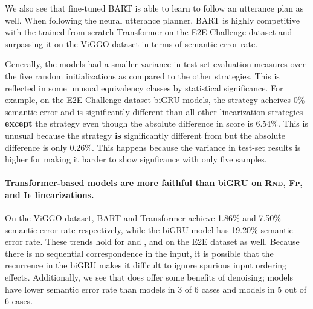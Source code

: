 We also see that fine-tuned BART is able to learn to follow an utterance plan
as well. When following the neural utterance planner,
BART is highly competitive with the trained from scratch Transformer
on the E2E Challenge dataset and surpassing it on the ViGGO dataset in terms of semantic error rate.


%




    Generally, the  models had a smaller variance in test-set
evaluation measures over the five random initializations as compared to the
other strategies. This is reflected in some unusual equivalency classes
by statistical significance. For example, on the E2E Challenge dataset biGRU models,
the  strategy acheives 0\% semantic error and is significantly
different than all other linearization strategies \textbf{except} 
the  strategy even though the absolute difference in score is 
6.54\%. This is unusual because the  strategy \textbf{is} 
significantly different from  but the absolute difference is
only 0.26\%. This happens because the variance in test-set results
is higher for  making it harder to show signficance with only
five samples.









\paragraph{Transformer-based models are more faithful than biGRU on
\textsc{Rnd, Fp}, and \textsc{If} linearizations.} On the ViGGO dataset, BART
and Transformer  achieve 1.86\% and 7.50\% semantic error rate 
respectively, while
the biGRU  model has 19.20\% semantic error rate. These trends hold for 
and , and on the E2E dataset as well. Because there is no
sequential correspondence in the input, it is possible that the recurrence in
the biGRU makes it difficult to ignore spurious input ordering effects.
Additionally, we see that  does offer some benefits of denoising;
 models have lower semantic error rate than  models in 3 of 6 cases 
and  models in 5 out of 6 cases.

